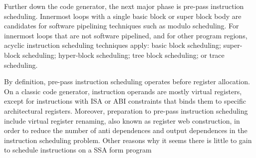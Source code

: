 Further down the code generator, the next major phase is pre-pass instruction
scheduling. Innermost loops with a single basic block or super block body are
candidates for software pipelining techniques such as modulo scheduling. For
innermost loops that are not software pipelined, and for other program regions,
acyclic instruction scheduling techniques apply: basic block scheduling;
super-block scheduling; hyper-block scheduling; tree block scheduling; or trace
scheduling.

By definition, pre-pass instruction scheduling operates before register
allocation. On a classic code generator, instruction operands are mostly virtual
registers, except for instructions with ISA or ABI constraints that binds them
to specific architectural registers. Moreover, preparation to pre-pass
instruction scheduling include virtual register renaming, also known as register
web construction, in order to reduce the number of anti dependences and output
dependences in the instruction scheduling problem. Other reasons why it seems
there is little to gain to schedule instructions on a SSA form program
